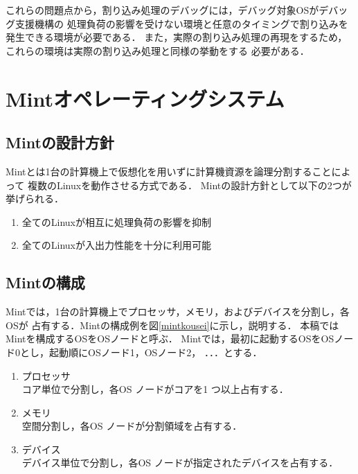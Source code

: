\documentclass[submit,techreq,noauthor,dvipdfmx]{ipsj}
\begin{document}
これらの問題点から，割り込み処理のデバッグには，デバッグ対象OSがデバッグ支援機構の
処理負荷の影響を受けない環境と任意のタイミングで割り込みを発生できる環境が必要である．
また，実際の割り込み処理の再現をするため，これらの環境は実際の割り込み処理と同様の挙動をする
必要がある．

\section{Mintオペレーティングシステム}\label{chap:Mint}

\subsection{Mintの設計方針}\label{sec:design_policy_of_Mint}

Mintとは1台の計算機上で仮想化を用いずに計算機資源を論理分割することによって
複数のLinuxを動作させる方式である．
Mintの設計方針として以下の2つが挙げられる．

\begin{enumerate}
    \item 全てのLinuxが相互に処理負荷の影響を抑制
    \item 全てのLinuxが入出力性能を十分に利用可能
\end{enumerate}

\subsection{Mintの構成}\label{sec:structure_of_Mint}


Mintでは，1台の計算機上でプロセッサ，メモリ，およびデバイスを分割し，各OSが
占有する．Mintの構成例を図\ref{mintkousei}に示し，説明する．
本稿ではMintを構成するOSをOSノードと呼ぶ．
Mintでは，最初に起動するOSをOSノード0とし，起動順にOSノード1，OSノード2，
．．．とする．

\begin{enumerate}
    \item プロセッサ\\
        コア単位で分割し，各OS ノードがコアを1 つ以上占有する．
    \item メモリ\\
        空間分割し，各OS ノードが分割領域を占有する．
    \item デバイス\\
        デバイス単位で分割し，各OS ノードが指定されたデバイスを占有する．
\end{enumerate}
\end{document}
